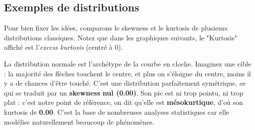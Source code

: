 \subsection{Exemples de distributions}

Pour bien fixer les idées, comparons le skewness et le kurtosis de plusieurs distributions classiques. Notez que dans les graphiques suivants, le "Kurtosis" affiché est l'\textit{excess kurtosis} (centré à 0).

\begin{examplebox}

\begin{center}
\end{center}

La distribution normale est l'archétype de la courbe en cloche. Imaginez une cible : la majorité des flèches touchent le centre, et plus on s'éloigne du centre, moins il y a de chances d'être touché. C'est une distribution parfaitement symétrique, ce qui se traduit par un \textbf{skewness nul (0.00)}. Son pic est ni trop pointu, ni trop plat : c'est notre point de référence, on dit qu'elle est \textbf{mésokurtique}, d'où son kurtosis de \textbf{0.00}. C'est la base de nombreuses analyses statistiques car elle modélise naturellement beaucoup de phénomènes.

\end{examplebox}

